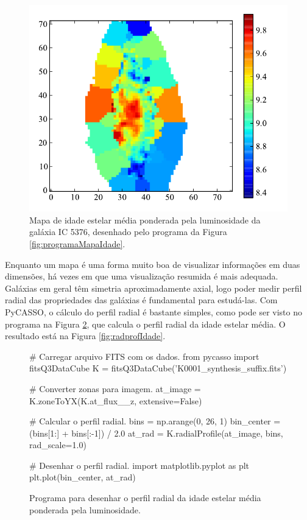 \begin{figure}
	\includegraphics{figuras/mapa-idade}
	\caption[Mapa da idade estelar média da galáxia IC 5376] {Mapa de idade estelar
	média ponderada pela luminosidade da galáxia IC 5376, desenhado pelo programa
	da Figura \ref{fig:programaMapaIdade}.}
	\label{fig:mapaIdade}
\end{figure}

Enquanto um mapa é uma forma muito boa de visualizar informações em duas
dimensões, há vezes em que uma visualização resumida é mais adequada. Galáxias
em geral têm simetria aproximadamente axial, logo poder medir perfil radial das
propriedades das galáxias é fundamental para estudá-las. Com PyCASSO, o cálculo
do perfil radial é bastante simples, como pode ser visto no programa na Figura
\ref{fig:programaRadprofIdade}, que calcula o perfil radial da idade estelar
média. O resultado está na Figura \ref{fig:radprofIdade}.

\begin{figure}
\begin{python}
# Carregar arquivo FITS com os dados.
from pycasso import fitsQ3DataCube
K = fitsQ3DataCube('K0001_synthesis_suffix.fits')

# Converter zonas para imagem.
at_image = K.zoneToYX(K.at_flux__z, extensive=False)

# Calcular o perfil radial.
bins = np.arange(0, 26, 1)
bin_center = (bins[1:] + bins[:-1]) / 2.0
at_rad = K.radialProfile(at_image, bins, rad_scale=1.0)

# Desenhar o perfil radial.
import matplotlib.pyplot as plt
plt.plot(bin_center, at_rad)
\end{python}
	\caption[Programa para desenhar o perfil radial da idade estelar] {Programa
	para desenhar o perfil radial da idade estelar média ponderada pela
	luminosidade.}
	\label{fig:programaRadprofIdade}
\end{figure}

